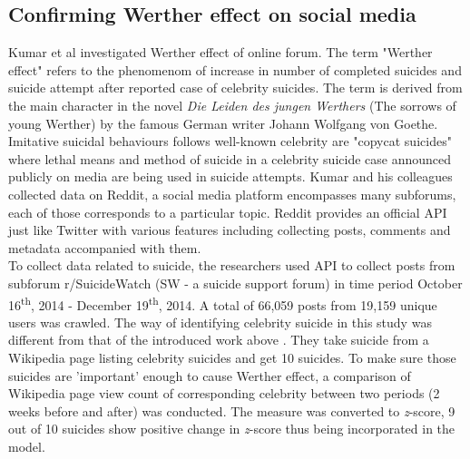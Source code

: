 \subsection{Confirming Werther effect on social media}
Kumar et al \cite{Kumar2015a} investigated Werther effect of online forum. The term "Werther effect" refers to the phenomenom of increase in number of completed suicides and suicide attempt after reported case of celebrity suicides. The term is derived from the main character in the novel \textit{Die Leiden des jungen Werthers} (The sorrows of young Werther) by the famous German writer Johann Wolfgang von Goethe. Imitative suicidal behaviours follows well-known celebrity are "copycat suicides" where lethal means and method of suicide in a celebrity suicide case announced publicly on media are being used in suicide attempts. Kumar and his colleagues collected data on Reddit, a social media platform encompasses many subforums, each of those corresponds to a particular topic. Reddit provides an official API just like Twitter with various features including collecting posts, comments and metadata accompanied with them.\\
To collect data related to suicide, the researchers used API to collect posts from subforum r/SuicideWatch (SW - a suicide support forum) in time period October 16\textsuperscript{th}, 2014 - December 19\textsuperscript{th}, 2014. A total of 66,059 posts from 19,159 unique users was crawled. The way of identifying celebrity suicide in this study was different from that of the introduced work above \cite{Won2013}. They take suicide from a Wikipedia page listing celebrity suicides and get 10 suicides. To make sure those suicides are 'important' enough to cause Werther effect, a comparison of Wikipedia page view count of corresponding celebrity between two periods (2 weeks before and after) was conducted. The measure was converted to \textit{z}-score, 9 out of 10 suicides show positive change in \textit{z}-score thus being incorporated in the model. \\
